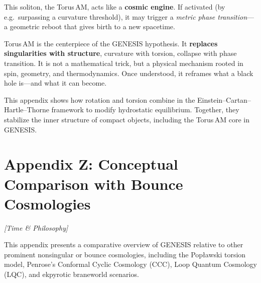 \documentclass{article}
\newcommand{\timetag}{\textcolor{orange!80!black}{\textit{[Time \& Philosophy]}}}
\begin{document}
This soliton, the Torus\,AM, acts like a \textbf{cosmic engine}. If activated (by e.g.\ surpassing a curvature threshold), it may trigger a \textit{metric phase transition}—a geometric reboot that gives birth to a new spacetime.

\begin{tcolorbox}[colback=gray!5, colframe=black!30, title=Why this matters]
Torus\,AM is the centerpiece of the \textsc{GENESIS} hypothesis. It \textbf{replaces singularities with structure}, curvature with torsion, collapse with phase transition. It is not a mathematical trick, but a physical mechanism rooted in spin, geometry, and thermodynamics. Once understood, it reframes what a black hole is—and what it can become.
\end{tcolorbox}

\begin{tcolorbox}[colback=gray!5, colframe=black!30, title=Summary]
This appendix shows how rotation and torsion combine in the Einstein–Cartan–Hartle–Thorne framework to modify hydrostatic equilibrium.
Together, they stabilize the inner structure of compact objects, including the Torus\,AM core in GENESIS.
\end{tcolorbox}

\section*{Appendix Z: Conceptual Comparison with Bounce Cosmologies}
\timetag


\label{app:bounce-comparison}

This appendix presents a comparative overview of GENESIS relative to other prominent nonsingular or bounce cosmologies, including the Popławski torsion model, Penrose's Conformal Cyclic Cosmology (CCC), Loop Quantum Cosmology (LQC), and ekpyrotic braneworld scenarios.
\end{document}
